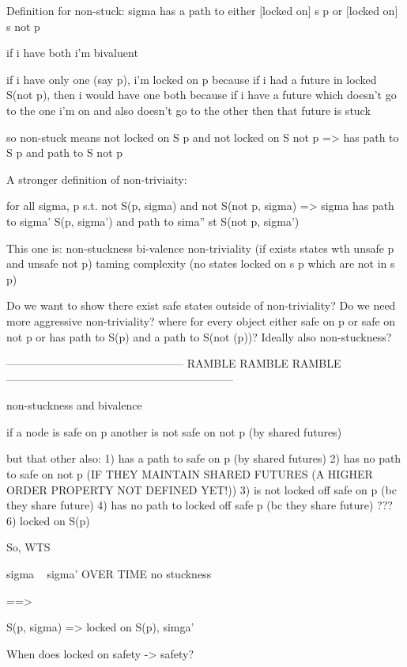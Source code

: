 \documentclass{article}
\theoremstyle{definition}
\begin{document}
\iffalse

Definition for non-stuck: sigma has a path to either [locked on] s p or [locked on] s not p

if i have both i'm bivaluent

if i have only one (say p), i'm locked on p
  because if i had a future in locked S(not p), then i would have one both
  because if i have a future which doesn't go to the one i'm on and also doesn't go to the other
  then that future is stuck


so non-stuck means not locked on S p and not locked on S not p => has path to S p and path to S not p



A stronger definition of non-triviaity:

for all sigma, p s.t. not S(p, sigma) and not S(not p, sigma) => sigma has path to sigma' S(p, sigma') and path to sima'' st S(not p, sigma')

This one is:
  non-stuckness
  bi-valence
  non-triviality (if exists states wth unsafe p and unsafe not p)
  taming complexity (no states locked on s p which are not in s p)

Do we want to show there exist safe states outside of non-triviality?
Do we need more aggressive non-triviality?
where for every object either safe on p or safe on not p or has path to S(p) and a path to S(not (p))?
Ideally also non-stuckness?


------------------------------------------------ RAMBLE RAMBLE RAMBLE --------------------------------------------------------------


non-stuckness and bivalence

if a node is safe on p
another is not safe on not p (by shared futures)

but that other also:
1) has a path to safe on p (by shared futures)
2) has no path to safe on not p (IF THEY MAINTAIN SHARED FUTURES (A HIGHER ORDER PROPERTY NOT DEFINED YET!))
3) is not locked off safe on p (bc they share future)
4) has no path to locked off safe p (bc they share future)
???
6) locked on S(p)





So, WTS 

sigma ~ sigma' OVER TIME
no stuckness

==>

S(p, sigma) => locked on S(p), simga'

When does locked on safety -> safety? 
\end{document}
